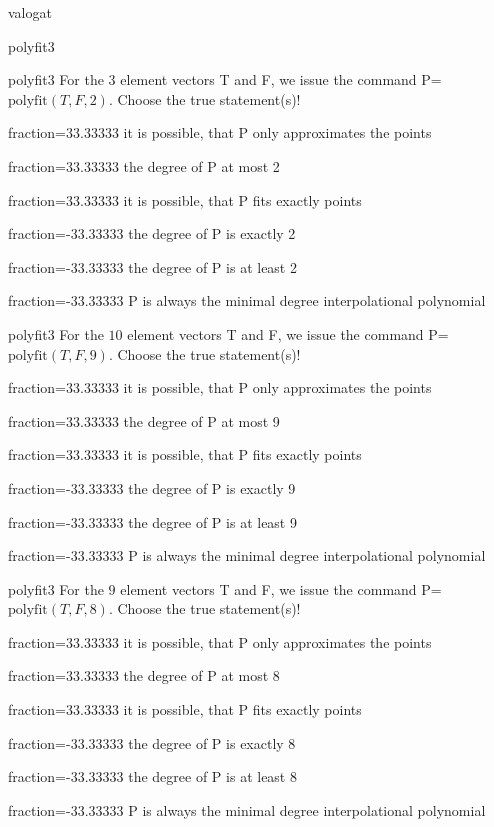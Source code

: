 \documentclass[12pt]{article}
\begin{document}
\begin{quiz}{valogat}
\begin{multi}[single=false]{polyfit3}
\end{multi}
\begin{multi}[single=false]{polyfit3}
For the $3$ element vectors T and F, we issue the command P=$\mathrm{polyfit}(T,F,2)$.
Choose the true statement(s)!
\item[fraction=33.33333] it is possible, that P only approximates the points
\item[fraction=33.33333] the degree of P at most 2
\item[fraction=33.33333] it is possible, that P fits exactly points
\item[fraction=-33.33333]  the degree of P is exactly 2
\item[fraction=-33.33333]  the degree of P is at least 2
\item[fraction=-33.33333]  P is always the minimal degree interpolational polynomial
\end{multi}
\begin{multi}[single=false]{polyfit3}
For the $10$ element vectors T and F, we issue the command P=$\mathrm{polyfit}(T,F,9)$.
Choose the true statement(s)!
\item[fraction=33.33333] it is possible, that P only approximates the points
\item[fraction=33.33333] the degree of P at most 9
\item[fraction=33.33333] it is possible, that P fits exactly points
\item[fraction=-33.33333]  the degree of P is exactly 9
\item[fraction=-33.33333]  the degree of P is at least 9
\item[fraction=-33.33333]  P is always the minimal degree interpolational polynomial
\end{multi}
\begin{multi}[single=false]{polyfit3}
For the $9$ element vectors T and F, we issue the command P=$\mathrm{polyfit}(T,F,8)$.
Choose the true statement(s)!
\item[fraction=33.33333] it is possible, that P only approximates the points
\item[fraction=33.33333] the degree of P at most 8
\item[fraction=33.33333] it is possible, that P fits exactly points
\item[fraction=-33.33333]  the degree of P is exactly 8
\item[fraction=-33.33333]  the degree of P is at least 8
\item[fraction=-33.33333]  P is always the minimal degree interpolational polynomial

\end{multi}
\end{quiz}
\end{document}
